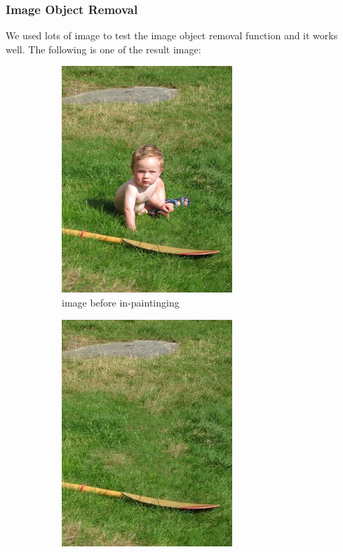 \subsubsection*{Image Object Removal}
\qquad We used lots of image to test the image object removal function and it works well. The following is one of the result image:
\begin{figure}[H]
	\begin{subfigure}[pos]{.5\textwidth}
		\centering
		\includegraphics*[width=0.8\linewidth]{kid.jpg}
		\caption{image before in-paintinging}
	\end{subfigure}%
	\begin{subfigure}[pos]{.5\textwidth}
		\centering
		\includegraphics*[width=0.8\linewidth]{kid_result.jpg}

\end{subfigure}
\end{figure}
